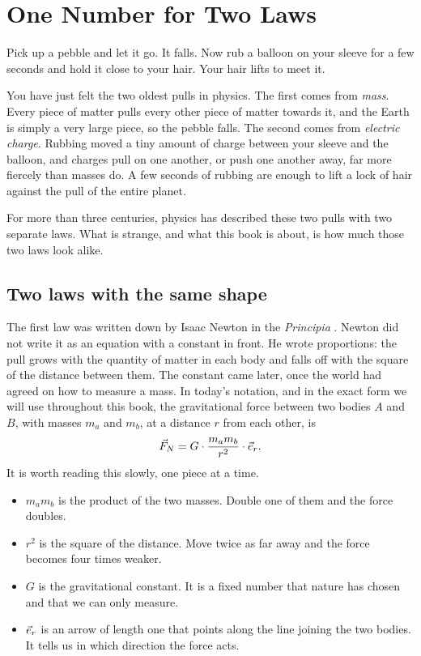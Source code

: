 \chapter{One Number for Two Laws}\label{ch:one-number}


Pick up a pebble and let it go. It falls. Now rub a balloon on your sleeve for a few seconds and hold it close to your hair. Your hair lifts to meet it.

You have just felt the two oldest pulls in physics. The first comes from \emph{mass}. Every piece of matter pulls every other piece of matter towards it, and the Earth is simply a very large piece, so the pebble falls. The second comes from \emph{electric charge}. Rubbing moved a tiny amount of charge between your sleeve and the balloon, and charges pull on one another, or push one another away, far more fiercely than masses do. A few seconds of rubbing are enough to lift a lock of hair against the pull of the entire planet.

For more than three centuries, physics has described these two pulls with two separate laws. What is strange, and what this book is about, is how much those two laws look alike.

\section{Two laws with the same shape}\label{sec:two-laws}


The first law was written down by Isaac Newton in the \emph{Principia} \citep{Newton1687,CohenWhitman1999}. Newton did not write it as an equation with a constant in front. He wrote proportions: the pull grows with the quantity of matter in each body and falls off with the square of the distance between them. The constant came later, once the world had agreed on how to measure a mass. In today's notation, and in the exact form we will use throughout this book, the gravitational force between two bodies $A$ and $B$, with masses $m_a$ and $m_b$, at a distance $r$ from each other, is
\[
\vec{F}_N = G \cdot \frac{m_a m_b}{r^2} \cdot \vec{e}_r .
\]
It is worth reading this slowly, one piece at a time.
\begin{itemize}
  \item $m_a m_b$ is the product of the two masses. Double one of them and the force doubles.
  \item $r^2$ is the square of the distance. Move twice as far away and the force becomes four times weaker.
  \item $G$ is the gravitational constant. It is a fixed number that nature has chosen and that we can only measure.
  \item $\vec{e}_r$ is an arrow of length one that points along the line joining the two bodies. It tells us in which direction the force acts.
\end{itemize}

